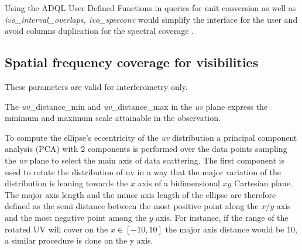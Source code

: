 \documentclass[11pt,a4paper]{ivoa}
\begin{document}
Using the ADQL User Defined Functions \citep{2024ivoa.spec.1107C} in queries for unit conversion as well as \emph{ivo\_interval\_overlaps, ivo\_specconv} would simplify the interface for the user and avoid  columns duplication for the spectral coverage .


\subsection{Spatial frequency coverage for visibilities}
\label{sec:spatfreq}
These parameters are valid for interferometry only.

The \emph{uv}\_distance\_min and \emph{uv}\_distance\_max  in the \emph{uv} plane 
express the minimum and maximum scale attainable in the observation.


To compute the ellipse's eccentricity of the \emph{uv} distribution a principal component analysis
(PCA) with 2 components is performed over the data points sampling the \emph{uv} plane to select the
main axis of data scattering. 
The first component is used to rotate the distribution of uv in a way that the major variation
of the distribution is leaning towards the $x$ axis of a bidimensional $xy$ Cartesian plane.
The major axis length and the minor axis length of the ellipse are therefore defined as the
semi distance between the most positive point along the $x$/$y$ axis and the most negative point
among the $y$ axis. For instance, if the range of the rotated UV will cover on the $x \in [-10,
10]$ the major axis distance would be 10, a similar procedure is done on the y axis.
\end{document}
